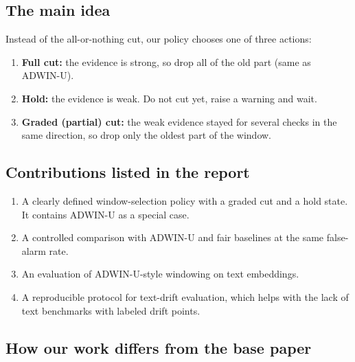 \documentclass[11pt,a4paper]{article}
\begin{document}
\subsection{The main idea}
Instead of the all-or-nothing cut, our policy chooses one of three actions:
\begin{enumerate}
  \item \textbf{Full cut:} the evidence is strong, so drop all of the old part (same as ADWIN-U).
  \item \textbf{Hold:} the evidence is weak. Do not cut yet, raise a warning and wait.
  \item \textbf{Graded (partial) cut:} the weak evidence stayed for several checks in the same direction, so drop only the oldest part of the window.
\end{enumerate}

\subsection{Contributions listed in the report}
\begin{enumerate}[label=(\roman*)]
  \item A clearly defined window-selection policy with a graded cut and a hold state. It contains ADWIN-U as a special case.
  \item A controlled comparison with ADWIN-U and fair baselines at the same false-alarm rate.
  \item An evaluation of ADWIN-U-style windowing on text embeddings.
  \item A reproducible protocol for text-drift evaluation, which helps with the lack of text benchmarks with labeled drift points.
\end{enumerate}

\subsection{How our work differs from the base paper}
\end{document}
